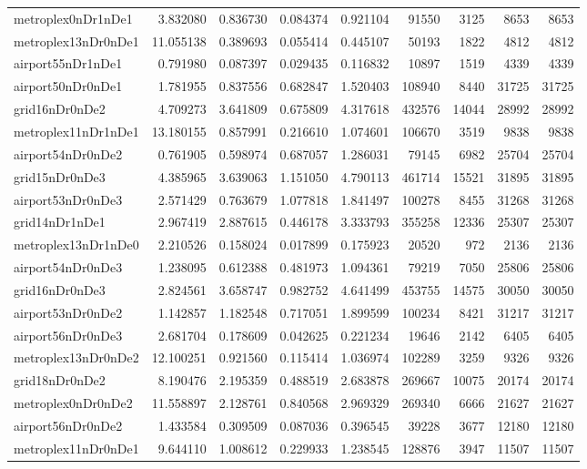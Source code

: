 \begin{longtable}{|l|r|r|r|r|r|r|r|r|}
metroplex0nDr1nDe1 & 3.832080 & 0.836730 & 0.084374 & 0.921104 & 91550 & 3125 & 8653 & 8653 \\
metroplex13nDr0nDe1 & 11.055138 & 0.389693 & 0.055414 & 0.445107 & 50193 & 1822 & 4812 & 4812 \\
airport55nDr1nDe1 & 0.791980 & 0.087397 & 0.029435 & 0.116832 & 10897 & 1519 & 4339 & 4339 \\
airport50nDr0nDe1 & 1.781955 & 0.837556 & 0.682847 & 1.520403 & 108940 & 8440 & 31725 & 31725 \\
grid16nDr0nDe2 & 4.709273 & 3.641809 & 0.675809 & 4.317618 & 432576 & 14044 & 28992 & 28992 \\
metroplex11nDr1nDe1 & 13.180155 & 0.857991 & 0.216610 & 1.074601 & 106670 & 3519 & 9838 & 9838 \\
airport54nDr0nDe2 & 0.761905 & 0.598974 & 0.687057 & 1.286031 & 79145 & 6982 & 25704 & 25704 \\
grid15nDr0nDe3 & 4.385965 & 3.639063 & 1.151050 & 4.790113 & 461714 & 15521 & 31895 & 31895 \\
airport53nDr0nDe3 & 2.571429 & 0.763679 & 1.077818 & 1.841497 & 100278 & 8455 & 31268 & 31268 \\
grid14nDr1nDe1 & 2.967419 & 2.887615 & 0.446178 & 3.333793 & 355258 & 12336 & 25307 & 25307 \\
metroplex13nDr1nDe0 & 2.210526 & 0.158024 & 0.017899 & 0.175923 & 20520 & 972 & 2136 & 2136 \\
airport54nDr0nDe3 & 1.238095 & 0.612388 & 0.481973 & 1.094361 & 79219 & 7050 & 25806 & 25806 \\
grid16nDr0nDe3 & 2.824561 & 3.658747 & 0.982752 & 4.641499 & 453755 & 14575 & 30050 & 30050 \\
airport53nDr0nDe2 & 1.142857 & 1.182548 & 0.717051 & 1.899599 & 100234 & 8421 & 31217 & 31217 \\
airport56nDr0nDe3 & 2.681704 & 0.178609 & 0.042625 & 0.221234 & 19646 & 2142 & 6405 & 6405 \\
metroplex13nDr0nDe2 & 12.100251 & 0.921560 & 0.115414 & 1.036974 & 102289 & 3259 & 9326 & 9326 \\
grid18nDr0nDe2 & 8.190476 & 2.195359 & 0.488519 & 2.683878 & 269667 & 10075 & 20174 & 20174 \\
metroplex0nDr0nDe2 & 11.558897 & 2.128761 & 0.840568 & 2.969329 & 269340 & 6666 & 21627 & 21627 \\
airport56nDr0nDe2 & 1.433584 & 0.309509 & 0.087036 & 0.396545 & 39228 & 3677 & 12180 & 12180 \\
metroplex11nDr0nDe1 & 9.644110 & 1.008612 & 0.229933 & 1.238545 & 128876 & 3947 & 11507 & 11507 \\

\end{longtable}
